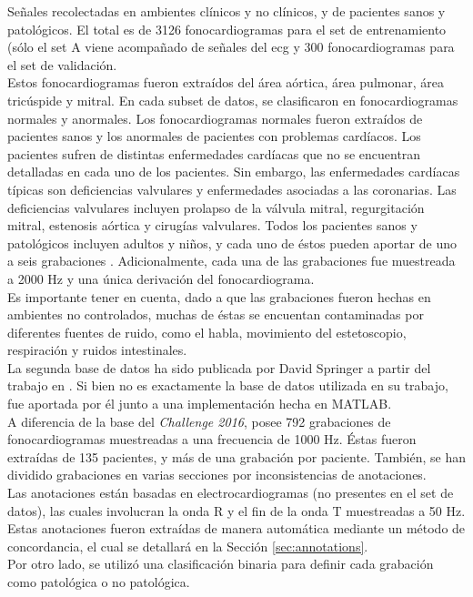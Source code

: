 \indent Señales recolectadas en ambientes clínicos y no clínicos, y de pacientes sanos y patológicos. El total es de
3126 fonocardiogramas para el set de entrenamiento (sólo el set A viene acompañado de señales del \acrshort{ecg} y
300 fonocardiogramas para el set de validación. \\
\indent Estos fonocardiogramas fueron extraídos del área aórtica, área pulmonar, área tricúspide y mitral. En cada
subset de datos, se clasificaron en fonocardiogramas normales y anormales. Los fonocardiogramas normales fueron
extraídos de pacientes sanos y los anormales de pacientes con problemas cardíacos. Los pacientes sufren de distintas
enfermedades cardíacas que no se encuentran detalladas en cada uno de los pacientes. Sin embargo, las enfermedades
cardíacas típicas son deficiencias valvulares y enfermedades asociadas a las coronarias. Las deficiencias valvulares
incluyen prolapso de la válvula mitral, regurgitación mitral, estenosis aórtica y cirugías valvulares. Todos los
pacientes sanos y patológicos incluyen adultos y niños, y cada uno de éstos pueden aportar de uno a seis grabaciones
. Adicionalmente, cada una de las grabaciones fue muestreada a 2000 Hz y una única derivación del fonocardiograma. \\
\indent Es importante tener en cuenta, dado a que las grabaciones fueron hechas en ambientes no controlados, muchas
de éstas se encuentan contaminadas por diferentes fuentes de ruido, como el habla, movimiento del estetoscopio,
respiración y ruidos intestinales. \\
\indent La segunda base de datos ha sido publicada por David Springer a partir del trabajo en \cite{pp:springer2015}
. Si bien no es exactamente la base de datos utilizada en su trabajo, fue aportada por él junto a una implementación
hecha en \textsc{MATLAB\texttrademark}. \\
\indent A diferencia de la base del \textit{Challenge 2016}, posee 792 grabaciones de fonocardiogramas muestreadas a
una frecuencia de 1000 Hz. Éstas fueron extraídas de 135 pacientes, y más de una grabación por paciente. También, se
han dividido grabaciones en varias secciones por inconsistencias de anotaciones. \\
\indent Las anotaciones están basadas en electrocardiogramas (no presentes en el set de datos), las cuales
involucran la onda R y el fin de la onda T muestreadas a 50 Hz. Estas anotaciones fueron extraídas de manera
automática mediante un método de concordancia, el cual se detallará en la Sección \ref{sec:annotations}. \\
\indent Por otro lado, se utilizó una clasificación binaria para definir cada grabación como patológica o no
patológica.


